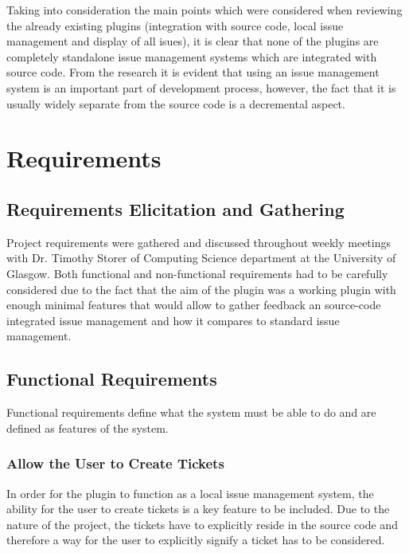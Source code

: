 \documentclass{4thYearProject}
\begin{document}
Taking into consideration the main points which were considered when reviewing the already existing plugins (integration with source code, local issue management and display of all isues), it is clear that none of the plugins are completely standalone issue management systems which are integrated with source code. 
From the research it is evident that using an issue management system is an important part of development process, however, the fact that it is usually widely separate from the source code is a decremental aspect. 

\chapter{Requirements}



\section{Requirements Elicitation and Gathering}

Project requirements were gathered and discussed throughout weekly meetings with Dr. Timothy Storer of Computing Science department at the University of Glasgow. Both functional and non-functional requirements had to be carefully considered due to the fact that the aim of the plugin was a working plugin with enough minimal features that would allow to gather feedback an source-code integrated issue management and how it compares to standard issue management. 


\section{Functional Requirements}

Functional requirements define what the system must be able to do and are defined as features of the system. 

\subsection{Allow the User to Create Tickets}

In order for the plugin to function as a local issue management system, the ability for the user to create tickets is a key feature to be included. Due to the nature of the project, the tickets have to explicitly reside in the source code and therefore a way for the user to explicitly signify a ticket has to be considered.
\end{document}
